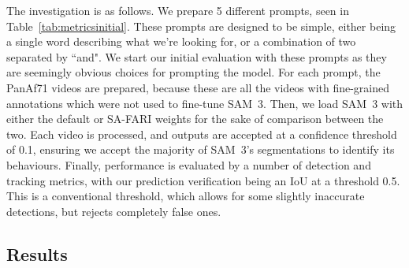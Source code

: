 \documentclass[author={Jacob Stephenson},
    degree={BSc},
    title={Robust Great Ape Species Detection in Wild Camera Trap Imagery with Promptable Concept Segmentation},
    unit={COMS30045},
    subtitle={}]{dissertation}
\begin{document}
The investigation is as follows. We prepare 5 different prompts, seen in Table~\ref{tab:metricsinitial}. These prompts are designed to be simple, either being a single word describing what we're looking for, or a combination of two separated by ``and". We start our initial evaluation with these prompts as they are seemingly obvious choices for prompting the model. For each prompt, the PanAf71 videos are prepared, because these are all the videos with fine-grained annotations which were not used to fine-tune SAM~3. Then, we load SAM~3 with either the default or SA-FARI weights for the sake of comparison between the two. Each video is processed, and outputs are accepted at a confidence threshold of 0.1, ensuring we accept the majority of SAM~3's segmentations to identify its behaviours. Finally, performance is evaluated by a number of detection and tracking metrics, with our prediction verification being an IoU at a threshold 0.5. This is a conventional threshold, which allows for some slightly inaccurate detections, but rejects completely false ones.



\subsection{Results}
\end{document}
